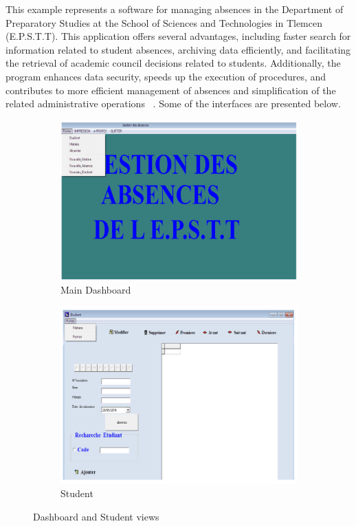 \documentclass[12pt,a4paper]{report}
\begin{document}
This example represents a software for managing absences in the Department of Preparatory Studies at the School of Sciences and Technologies in Tlemcen (E.P.S.T.T).
This application offers several advantages, including faster search for information related to student absences, archiving data efficiently, and facilitating the retrieval of academic council decisions related to students.
Additionally, the program enhances data security, speeds up the execution of procedures, and contributes to more efficient management of absences and simplification of the related administrative operations ~\cite{mekki2014}.
Some of the interfaces are presented below.
\begin{figure}[htbp]
    \centering
    \begin{subfigure}[b]{0.45\textwidth}
        \centering
        \includegraphics[width=\textwidth]{images/morsli/mekki1.png}
        \caption{Main Dashboard}
        \label{fig:dashboard}
    \end{subfigure}
    \hfill
    \begin{subfigure}[b]{0.45\textwidth}
        \centering
        \includegraphics[width=\textwidth]{images/morsli/mekki2.png}
        \caption{Student}
        \label{fig:student}
    \end{subfigure}
    \caption{Dashboard and Student views}
    \label{fig:attendance-system}
\end{figure}
\end{document}

